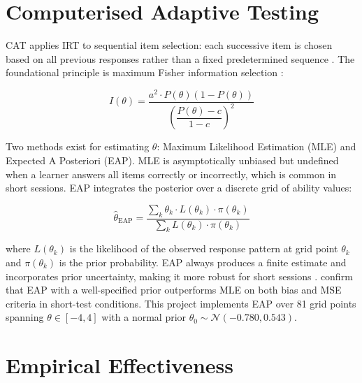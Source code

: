 \section{Computerised Adaptive Testing}
\label{sec:lr_cat}

CAT applies IRT to sequential item selection: each successive item is chosen
based on all previous responses rather than a fixed predetermined sequence
\parencite{wainer2000}. The foundational principle is maximum Fisher information
selection \parencite{weiss1982}:

\begin{equation}
  I(\theta) = \frac{a^2 \cdot P(\theta)(1-P(\theta))}{\left(\dfrac{P(\theta)-c}{1-c}\right)^2}
  \label{eq:fisher_information}
\end{equation}

Two methods exist for estimating $\theta$: Maximum Likelihood Estimation
(MLE) and Expected A Posteriori (EAP). MLE is asymptotically unbiased but
undefined when a learner answers all items correctly or incorrectly, which
is common in short sessions. EAP integrates the posterior over a discrete
grid of ability values:

\begin{equation}
  \hat{\theta}_{\text{EAP}} = \frac{\displaystyle\sum_k \theta_k \cdot L(\theta_k) \cdot \pi(\theta_k)}{\displaystyle\sum_k L(\theta_k) \cdot \pi(\theta_k)}
  \label{eq:eap}
\end{equation}

where $L(\theta_k)$ is the likelihood of the observed response pattern at grid
point $\theta_k$ and $\pi(\theta_k)$ is the prior probability. EAP always
produces a finite estimate and incorporates prior uncertainty, making it more
robust for short sessions \parencite{bock1982}. \textcite{baker2004} confirm
that EAP with a well-specified prior outperforms MLE on both bias and MSE
criteria in short-test conditions. This project implements EAP over 81 grid
points spanning $\theta \in [-4, 4]$ with a normal prior
$\theta_0 \sim \mathcal{N}(-0.780, 0.543)$.

\section{Empirical Effectiveness}
\label{sec:lr_effectiveness}

